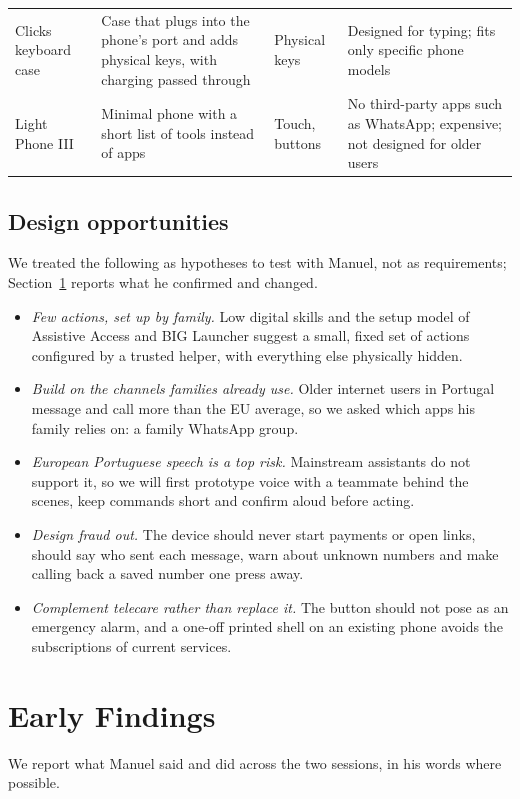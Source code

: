 \documentclass[acmtog,nonacm]{acmart}
\begin{document}
\begin{table}[t]
\begin{tabular}{@{}L{0.17\textwidth}L{0.33\textwidth}L{0.1\textwidth}L{0.34\textwidth}@{}}
    \addlinespace
    Clicks keyboard case~\cite{clicks2026support} & Case that plugs into the phone's port and adds physical keys, with charging passed through & Physical keys & Designed for typing; fits only specific phone models \\
    \addlinespace
    Light Phone III~\cite{light2026phoneiii, engadget2025lightphone} & Minimal phone with a short list of tools instead of apps & Touch, buttons & No third-party apps such as WhatsApp; expensive; not designed for older users \\
    \bottomrule
  \end{tabular}
\end{table}

\subsection{Design opportunities}
We treated the following as hypotheses to test with Manuel, not as requirements; Section~\ref{sec:findings} reports what he confirmed and changed.
\begin{itemize}
  \item \emph{Few actions, set up by family.} Low digital skills and the setup model of Assistive Access and BIG Launcher suggest a small, fixed set of actions configured by a trusted helper, with everything else physically hidden.
  \item \emph{Build on the channels families already use.} Older internet users in Portugal message and call more than the EU average, so we asked which apps his family relies on: a family WhatsApp group.
  \item \emph{European Portuguese speech is a top risk.} Mainstream assistants do not support it, so we will first prototype voice with a teammate behind the scenes, keep commands short and confirm aloud before acting.
  \item \emph{Design fraud out.} The device should never start payments or open links, should say who sent each message, warn about unknown numbers and make calling back a saved number one press away.
  \item \emph{Complement telecare rather than replace it.} The button should not pose as an emergency alarm, and a one-off printed shell on an existing phone avoids the subscriptions of current services.
\end{itemize}


\section{Early Findings}\label{sec:findings}
We report what Manuel said and did across the two sessions, in his words where possible.
\end{document}
